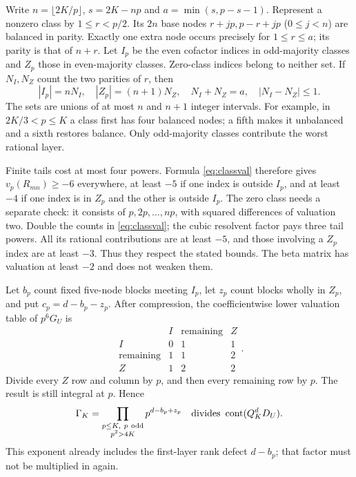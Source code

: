 Write $n=\lfloor2K/p\rfloor$, $s=2K-np$ and $a=\min(s,p-s-1)$.
Represent a nonzero class by $1\leq r<p/2$. Its $2n$ base nodes
$r+jp,p-r+jp$ ($0\leq j<n$) are balanced in parity. Exactly one
extra node occurs precisely for $1\leq r\leq a$; its parity is
that of $n+r$. Let $I_p$ be the even cofactor indices in
odd-majority classes and $Z_p$ those in even-majority classes.
Zero-class indices belong to neither set. If $N_I,N_Z$ count the
two parities of $r$, then
\[
 |I_p|=nN_I,\quad |Z_p|=(n+1)N_Z,\quad
 N_I+N_Z=a,\quad |N_I-N_Z|\leq1.
\]
The sets are unions of at most $n$ and $n+1$ integer intervals.
For example, in $2K/3<p\leq K$ a class first has four balanced
nodes; a fifth makes it unbalanced and a sixth restores balance.
Only odd-majority classes contribute the worst rational layer.

Finite tails cost at most four powers. Formula \eqref{eq:classval}
therefore gives $v_p(R_{mn})\geq-6$ everywhere, at least $-5$ if
one index is outside $I_p$, and at least $-4$ if one index is in
$Z_p$ and the other is outside $I_p$. The zero class needs a separate
check: it consists of $p,2p,\ldots,np$, with squared differences
of valuation two. Double the counts in \eqref{eq:classval}; the
cubic resolvent factor pays three tail powers. All its rational
contributions are at least $-5$, and those involving a $Z_p$ index
are at least $-3$. Thus they respect the stated bounds. The beta
matrix has valuation at least $-2$ and does not weaken them.

Let $b_p$ count fixed five-node blocks meeting $I_p$, let $z_p$ count
blocks wholly in $Z_p$, and put $c_p=d-b_p-z_p$. After compression,
the coefficientwise lower valuation table of $p^6G_U$ is
\[
 \begin{array}{c|ccc}
 &I&\text{remaining}&Z\\\hline
 I&0&1&1\\
 \text{remaining}&1&1&2\\
 Z&1&2&2
 \end{array}.
\]
Divide every $Z$ row and column by $p$, and then every remaining
row by $p$. The result is still integral at $p$. Hence
\begin{equation}\label{eq:Gamma}
 \Gamma_K=\prod_{\substack{p\leq K,\ p\ \mathrm{odd}\\p^2>4K}}
       p^{d-b_p+z_p}\quad\hbox{divides }\operatorname{cont}(Q_K^dD_U).
\end{equation}
This exponent already includes the first-layer rank defect $d-b_p$;
that factor must not be multiplied in again.

